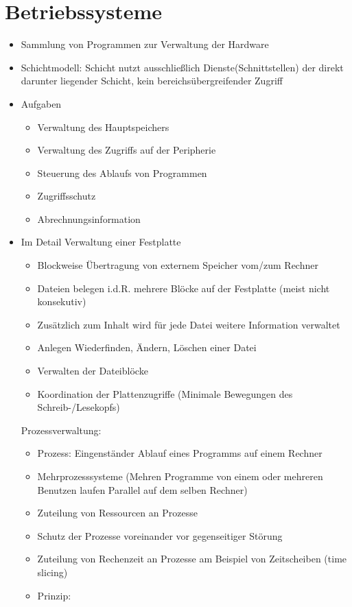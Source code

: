 \documentclass[10pt,a5paper]{article}
\begin{document}
\section{Betriebssysteme}
\begin{itemize}
\item Sammlung von Programmen zur Verwaltung der Hardware
\item Schichtmodell:
\subitem Schicht nutzt ausschließlich Dienste(Schnittstellen) der direkt darunter liegender Schicht, kein bereichsübergreifender Zugriff
\item Aufgaben \begin{itemize}
\item Verwaltung des Hauptspeichers
\item Verwaltung des Zugriffs auf der Peripherie
\item Steuerung des Ablaufs von Programmen
\item Zugriffsschutz
\item Abrechnungsinformation
\end{itemize}
\item Im Detail
\subitem Verwaltung einer Festplatte\begin{itemize}
\item Blockweise Übertragung von externem  Speicher vom/zum Rechner
\item Dateien belegen i.d.R. mehrere Blöcke auf der Festplatte (meist nicht konsekutiv)
\item Zusätzlich zum Inhalt wird für jede Datei weitere Information verwaltet
\item Anlegen Wiederfinden, Ändern, Löschen einer Datei
\item Verwalten der Dateiblöcke
\item Koordination der Plattenzugriffe (Minimale Bewegungen des Schreib-/Lesekopfs)
\end{itemize}
\subitem Prozessverwaltung:\begin{itemize}
\item Prozess: Eingenständer Ablauf eines Programms auf einem Rechner
\item Mehrprozesssysteme (Mehren Programme von einem oder mehreren Benutzen laufen Parallel auf dem selben Rechner)
\item Zuteilung von Ressourcen an Prozesse
\item Schutz der Prozesse voreinander vor gegenseitiger Störung
\item Zuteilung von Rechenzeit an Prozesse am Beispiel von Zeitscheiben (time slicing)
\item Prinzip:

\end{itemize}
\end{itemize}
\end{document}

